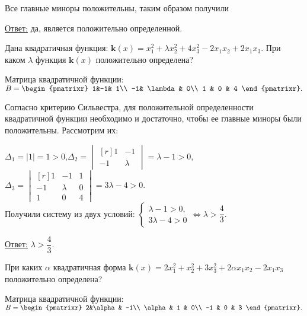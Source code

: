 Все главные миноры положительны, таким образом получили

\underline{Ответ:} да, является положительно определенной.\\

\begin{prim}
Дана квадратичная функция: $\mathbf{k}(x)=x^2_1+\lambda x^2_2+4x^2_3-2x_1x_2+2x_1x_3$. При каком $\lambda$ функция $\mathbf{k}(x)$ положительно определена?
\end{prim}
Матрица квадратичной функции: $B=\begin{pmatrixr}
1&-1& 1\\
-1& \lambda & 0\\
1 & 0 & 4
\end{pmatrixr}.$

Согласно критерию Сильвестра, для положительной определенности квадратичной функции необходимо и достаточно, чтобы ее главные миноры были положительны. Рассмотрим их:

$\Delta_1=|1|=1>0$,\hspace{14pt}$\Delta_2=\begin{vmatrix*}[r]
1&-1\\
-1&\lambda
\end{vmatrix*}=\lambda-1>0$, \hspace{14pt}$\Delta_3=\begin{vmatrix*}[r]
1&-1& 1\\
-1& \lambda & 0\\
1 & 0 & 4
\end{vmatrix*}=3\lambda-4>0.$ \\

Получили систему из двух условий: $\begin{cases}\lambda-1>0,\\
3\lambda-4>0
\end{cases}\Leftrightarrow \lambda>\dfrac{4}{3}.$

\underline{Ответ:} $\lambda>\dfrac{4}{3}.$\\

\begin{prim}
При каких $\alpha$ квадратичная форма $\textbf{k}(x) = 2x_1^2+x_2^2+3x_3^2+2\alpha x_1x_2-2x_1x_3$ положительно определена?
\end{prim}
Матрица квадратичной функции: $B=\begin{pmatrixr}
2&\alpha& -1\\
\alpha& 1 & 0\\
-1 & 0 & 3
\end{pmatrixr}.$

